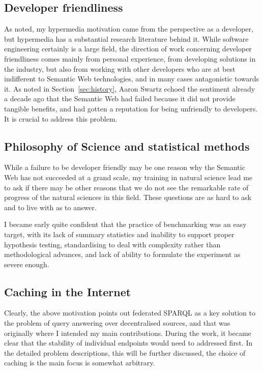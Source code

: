 \subsection{Developer friendliness}

As noted, my hypermedia motivation came from the perspective as a
developer, but hypermedia has a substantial research literature behind
it. While software engineering certainly is a large field, the
direction of work concerning developer friendliness comes mainly from
personal experience, from developing solutions in the industry, but
also from working with other developers who are at best indifferent to
Semantic Web technologies, and in many cases antagonistic towards it. 
As noted in Section~\ref{sec:history}, Aaron Swartz echoed the
sentiment already a decade ago that the Semantic Web had failed
because it did not provide tangible benefits, and had gotten a
reputation for being unfriendly to developers. It is crucial to
address this problem.


\subsection{Philosophy of Science and statistical methods}

While a failure to be developer friendly may be one reason why the
Semantic Web has not succeeded at a grand scale, my training in
natural science lead me to ask if there may be other reasons that we
do not see the remarkable rate of progress of the natural sciences in
this field. These questions are as hard to ask and to live with as to
answer. 

I became early quite confident that the practice of benchmarking was
an easy target, with its lack of summary statistics and inability to
support proper hypothesis testing, standardising to deal with
complexity rather than methodological advances, and lack of ability to
formulate the experiment as severe enough.

\subsection{Caching in the Internet}\label{sec:motivcache}

Clearly, the above motivation points out federated SPARQL as a key
solution to the problem of query answering over decentralised sources,
and that was originally where I intended my main contributions. During
the work, it became clear that the stability of individual endpoints
would need to addressed first. In the detailed problem descriptions,
this will be further discussed, the choice of caching is the main
focus is somewhat arbitrary. 

